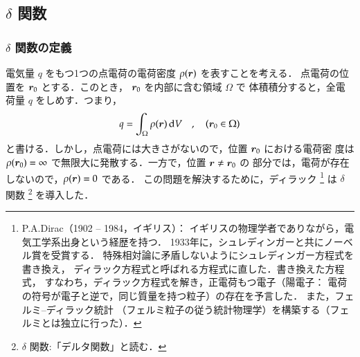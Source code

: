     \subsection{$\delta$ 関数}\label{subsub:delta_function}
        \subsubsection{$\delta$ 関数の定義}\label{subsub:delta_function_teigi}
            電気量 $q$ をもつ1つの点電荷の電荷密度 $\rho(\boldsymbol{r})$ を表すことを考える．
            点電荷の位置を $\boldsymbol{r}_{0}$ とする．このとき， $\boldsymbol{r}_{0}$ を内部に含む領域 $\Omega$ で
            体積積分すると，全電荷量 $q$ をしめす．つまり，
                \begin{align}
                    q=\int_\Omega\rho(\boldsymbol{r})\,\mathrm{d} V \quad,\quad \left( \boldsymbol{r}_{0} \in \Omega \right)
                \end{align}
            と書ける．しかし，点電荷には大きさがないので，位置 $\boldsymbol{r}_{0}$ における電荷密
            度は $\rho(\boldsymbol{r}_{0})=\infty$ で無限大に発散する．一方で，位置 $\boldsymbol{r}\neq\boldsymbol{r}_{0}$ の
            部分では，電荷が存在しないので，$\rho(\boldsymbol{r})=0$ である．
            この問題を解決するために，ディラック
                \footnote{
                    P.A.Dirac（1902 -- 1984，イギリス）：
                    イギリスの物理学者でありながら，電気工学系出身という経歴を持つ．
                    1933年に，シュレディンガーと共にノーベル賞を受賞する．
                    特殊相対論に矛盾しないようにシュレディンガー方程式を書き換え，
                    ディラック方程式と呼ばれる方程式に直した．書き換えた方程式，
                    すなわち，ディラック方程式を解き，正電荷もつ電子（陽電子：
                    電荷の符号が電子と逆で，同じ質量を持つ粒子）の存在を予言した．
                    また，フェルミ--ディラック統計
                    （フェルミ粒子の従う統計物理学）を構築する（フェルミとは独立に行った）．
                }
            は $\delta$ 関数
                \footnote{
                   $\delta$ 関数:「デルタ関数」と読む．
                }
            を導入した．

